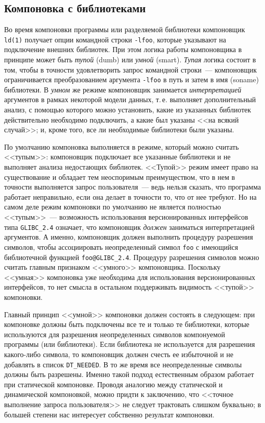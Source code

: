 \documentclass[russian,a4paper,12pt,titlepage]{article}
\begin{document}
\subsection{Компоновка с библиотеками}
\label{linking-with-libraries}
Во время компоновки программы или разделяемой библиотеки компоновщик \verb|ld(1)| получает опции командной строки \verb|-lfoo|,
которые указывают на подключение внешних библиотек.  При этом логика работы компоновщика в принципе может быть \emph{тупой} (dumb)
или \emph{умной} (smart).  \emph{Тупая} логика состоит в том, чтобы в точности удовлетворить запрос командной строки~--- компоновщик
ограничивается преобразованием аргумента \verb|-lfoo| в путь и затем в имя (soname) библиотеки.  В \emph{умном} же режиме компоновщик
занимается \emph{интерпретацией} аргументов в рамках некоторой модели данных, т.\,е. выполняет дополнительный анализ, с помощью которого
можно установить, какие из указанных библиотек действительно необходимо подключить, а какие был указаны <<на всякий случай>>;
и, кроме того, все ли необходимые библиотеки были указаны.

По умолчанию компоновка выполняется в режиме, который можно считать <<тупым>>: компоновщик подключает все указанные библиотеки
и не выполняет анализа недостающих библиотек.  <<Тупой>> режим имеет право на существование и обладает тем неоспоримым преимуществом,
что в нем в точности выполняется запрос пользователя~--- ведь нельзя сказать, что программа работает неправильно, если она делает
в точности то, что от нее требуют.  Но на самом деле режим компоновки по умолчанию не является полностью <<тупым>>~--- возможность
использования версионированных интерфейсов типа \verb|GLIBC_2.4| означает, что компоновщик \emph{должен} заниматься интерпретацией
аргументов.  А именно, компоновщик должен выполнить процедуру разрешения символов, чтобы ассоциировать неопределенный символ
\verb|foo| с имеющийся библиотечной функцией \verb|foo@GLIBC_2.4|.  Процедуру разрешения символов можно считать главным признаком
<<умного>> компоновщика.  Поскольку <<умная>> компоновка уже необходима для использования версионированных интерфейсов, то нет смысла
в остальном поддерживать видимость <<тупой>> компоновки.

Главный принцип <<умной>> компоновки должен состоять в следующем: при компоновке должны быть подключены все те и только те библиотеки,
которые используются для разрешения неопределенных символов компонуемой программы (или библиотеки).  Если библиотека не используется
для разрешения какого-либо символа, то компоновщик должен счесть ее избыточной и не добавлять в список \verb|DT_NEEDED|.
В то же время все неопределенные символы должны быть разрешены.  Именно такой подход естественным образом работает
при статической компоновке.  Проводя аналогию между статической и динамической компоновкой, можно придти к заключению,
что <<точное выполнение запроса пользователя>> не следует трактовать слишком буквально; в большей степени нас интересует
собственно результат компоновки.
\end{document}
